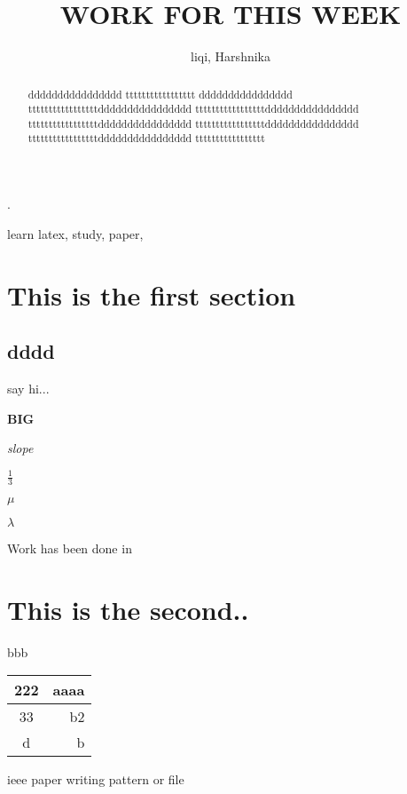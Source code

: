 \documentclass[10pt,journal]{IEEEtran}%
\begin{document}
\title{WORK FOR THIS WEEK}
\author{liqi, Harshnika}

\maketitle.

\begin{abstract}
dddddddddddddddd
ttttttttttttttttt
dddddddddddddddd
tttttttttttttttttdddddddddddddddd
tttttttttttttttttdddddddddddddddd
tttttttttttttttttdddddddddddddddd
tttttttttttttttttdddddddddddddddd
tttttttttttttttttdddddddddddddddd
ttttttttttttttttt
\end{abstract}

\begin{IEEEkeywords}
learn latex, study, paper,
\end{IEEEkeywords}

\section{This is the first section}
\subsection{dddd}
say hi...

\textbf{BIG}

\emph{slope}

$\frac{1}{3}$

$\mu$

$\lambda$

Work has been done in \cite{Yu2011Mining}
\section{This is the second..}
bbb
\cite{secondCite}
\begin{tabular}{|c|r|} %
  \hline
  222 & aaaa \\\hline
  33 & b2 \\
  d & b \\
  \hline
\end{tabular}

ieee paper writing pattern or file


\end{document}
